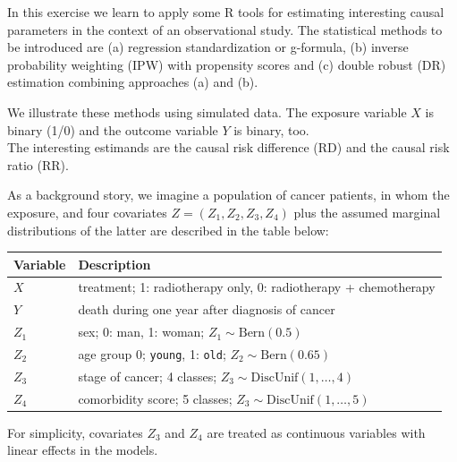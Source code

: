 \documentclass[
]{book}
\newcounter{none} %
\begin{document}
In this exercise we learn to apply some R tools for estimating
interesting causal parameters in the context of an observational study.
The statistical methods to be introduced are (a) regression
standardization or g-formula, (b) inverse probability weighting (IPW)
with propensity scores and (c) double robust (DR) estimation combining
approaches (a) and (b).

We illustrate these methods using simulated data. The exposure variable
\(X\) is binary (1/0) and the outcome variable \(Y\) is binary, too.\\
The interesting estimands are the causal risk difference (RD) and the
causal risk ratio (RR).

As a background story, we imagine a population of cancer patients, in
whom the exposure, and four covariates \(Z = (Z_1, Z_2, Z_3, Z_4)\) plus
the assumed marginal distributions of the latter are described in the
table below:

{\def\LTcaptype{none} %
\begin{longtable}[]{@{}
  >{\raggedright\arraybackslash}p{}
  >{\raggedright\arraybackslash}p{}@{}}
\toprule\noalign{}
\begin{minipage}[b]{\linewidth}\raggedright
Variable
\end{minipage} & \begin{minipage}[b]{\linewidth}\raggedright
Description
\end{minipage} \\
\midrule\noalign{}
\endhead
\bottomrule\noalign{}
\endlastfoot
\(X\) & treatment; 1: radiotherapy only, 0: radiotherapy + chemotherapy \\
\(Y\) & death during one year after diagnosis of cancer \\
\(Z_1\) & sex; 0: man, 1: woman; \(Z_1 \sim \text{Bern}(0.5)\) \\
\(Z_2\) & age group 0; \texttt{young}, 1: \texttt{old}; \(Z_2 \sim \text{Bern}(0.65)\) \\
\(Z_3\) & stage of cancer; 4 classes; \(Z_3 \sim \text{DiscUnif}(1, \dots, 4)\) \\
\(Z_4\) & comorbidity score; 5 classes; \(Z_3 \sim \text{DiscUnif}(1, \dots, 5)\) \\
\end{longtable}
}

For simplicity, covariates \(Z_3\) and \(Z_4\) are treated as continuous
variables with linear effects in the models.
\end{document}
